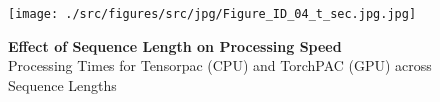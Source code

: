         \clearpage
        \begin{figure}[ht]
        	\centering
            \texttt{[image: ./src/figures/src/jpg/Figure\_ID\_04\_t\_sec.jpg.jpg]}

\caption{\textbf{
Effect of Sequence Length on Processing Speed
}
\smallskip
\\
Processing Times for Tensorpac (CPU) and TorchPAC (GPU) across Sequence Lengths
}
        	\label{fig:04_t_sec}
        \end{figure}
